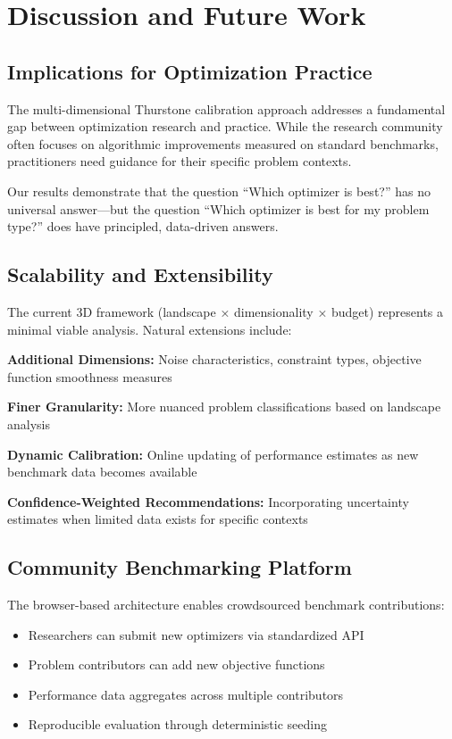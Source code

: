 \documentclass[article]{jss}
\begin{document}
\section{Discussion and Future Work} \label{sec:discussion}

\subsection{Implications for Optimization Practice}

The multi-dimensional Thurstone calibration approach addresses a fundamental gap between optimization research and practice. While the research community often focuses on algorithmic improvements measured on standard benchmarks, practitioners need guidance for their specific problem contexts.

Our results demonstrate that the question ``Which optimizer is best?'' has no universal answer—but the question ``Which optimizer is best for my problem type?'' does have principled, data-driven answers.

\subsection{Scalability and Extensibility}

The current 3D framework (landscape × dimensionality × budget) represents a minimal viable analysis. Natural extensions include:

\textbf{Additional Dimensions:} Noise characteristics, constraint types, objective function smoothness measures

\textbf{Finer Granularity:} More nuanced problem classifications based on landscape analysis

\textbf{Dynamic Calibration:} Online updating of performance estimates as new benchmark data becomes available

\textbf{Confidence-Weighted Recommendations:} Incorporating uncertainty estimates when limited data exists for specific contexts

\subsection{Community Benchmarking Platform}

The browser-based architecture enables crowdsourced benchmark contributions:
\begin{itemize}
\item Researchers can submit new optimizers via standardized API
\item Problem contributors can add new objective functions
\item Performance data aggregates across multiple contributors
\item Reproducible evaluation through deterministic seeding
\end{itemize}
\end{document}
